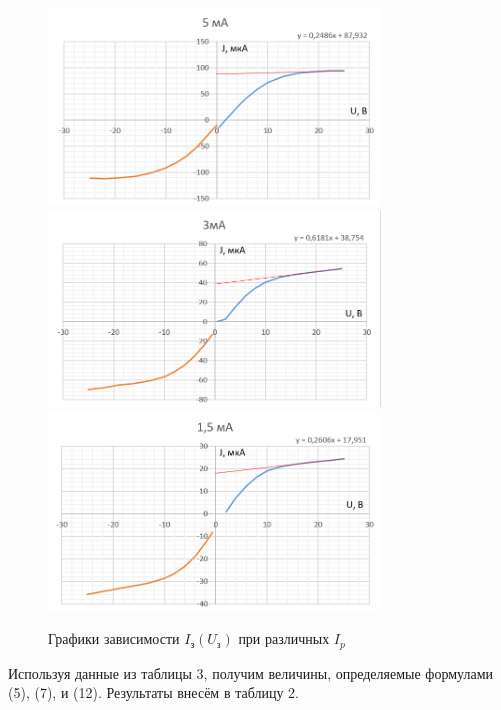 \documentclass[a4paper]{article}
\theoremstyle{definition}
\theoremstyle{remark}
\begin{document}
    \begin{figure}[h!]
        \centering
        \includegraphics[width = 250pt]{image/graph5.png}
        \includegraphics[width = 250pt]{image/graph3.png}
        \includegraphics[width = 250pt]{image/graph15.png}
        \caption{Графики зависимости $I_{\text{з}}(U_{\text{з}})$ при различных $I_p$}
    \end{figure}

    Используя данные из таблицы 3, получим величины, определяемые формулами (5), (7), и (12). Результаты внесём в таблицу 2.
\end{document}
